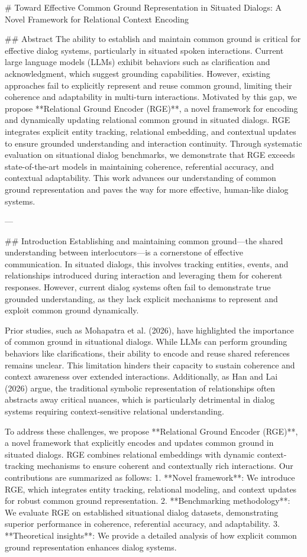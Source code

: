 # Toward Effective Common Ground Representation in Situated Dialogs: A Novel Framework for Relational Context Encoding

## Abstract
The ability to establish and maintain common ground is critical for effective dialog systems, particularly in situated spoken interactions. Current large language models (LLMs) exhibit behaviors such as clarification and acknowledgment, which suggest grounding capabilities. However, existing approaches fail to explicitly represent and reuse common ground, limiting their coherence and adaptability in multi-turn interactions. Motivated by this gap, we propose **Relational Ground Encoder (RGE)**, a novel framework for encoding and dynamically updating relational common ground in situated dialogs. RGE integrates explicit entity tracking, relational embedding, and contextual updates to ensure grounded understanding and interaction continuity. Through systematic evaluation on situational dialog benchmarks, we demonstrate that RGE exceeds state-of-the-art models in maintaining coherence, referential accuracy, and contextual adaptability. This work advances our understanding of common ground representation and paves the way for more effective, human-like dialog systems.

---

## Introduction
Establishing and maintaining common ground—the shared understanding between interlocutors—is a cornerstone of effective communication. In situated dialogs, this involves tracking entities, events, and relationships introduced during interaction and leveraging them for coherent responses. However, current dialog systems often fail to demonstrate true grounded understanding, as they lack explicit mechanisms to represent and exploit common ground dynamically.

Prior studies, such as Mohapatra et al. (2026), have highlighted the importance of common ground in situational dialogs. While LLMs can perform grounding behaviors like clarifications, their ability to encode and reuse shared references remains unclear. This limitation hinders their capacity to sustain coherence and context awareness over extended interactions. Additionally, as Han and Lai (2026) argue, the traditional symbolic representation of relationships often abstracts away critical nuances, which is particularly detrimental in dialog systems requiring context-sensitive relational understanding.

To address these challenges, we propose **Relational Ground Encoder (RGE)**, a novel framework that explicitly encodes and updates common ground in situated dialogs. RGE combines relational embeddings with dynamic context-tracking mechanisms to ensure coherent and contextually rich interactions. Our contributions are summarized as follows:
1. **Novel framework**: We introduce RGE, which integrates entity tracking, relational modeling, and context updates for robust common ground representation.
2. **Benchmarking methodology**: We evaluate RGE on established situational dialog datasets, demonstrating superior performance in coherence, referential accuracy, and adaptability.
3. **Theoretical insights**: We provide a detailed analysis of how explicit common ground representation enhances dialog systems.

